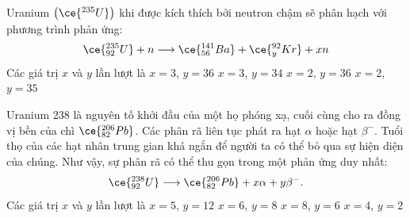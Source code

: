 \begin{ex}
	Uranium $\left(\ce{^{235}U}\right)$ khi được kích thích bởi neutron chậm	sẽ phân hạch với phương trình phản ứng:
	$$\ce{^{235}_{92}U}+n\longrightarrow \ce{^{141}_{56}Ba}+\ce{^{92}_{y}Kr}+xn$$
	Các giá trị $x$ và $y$ lần lượt là
	\choice
	{\True $x=3$, $y=36$}
	{$x=3$, $y=34$}
	{$x=2$, $y=36$}
	{$x=2$, $y=35$}
\end{ex}
\begin{ex}
	Uranium 238 là nguyên tố khởi đầu của một họ phóng xạ, cuối cùng cho ra đồng vị bền của chì $\ce{^{206}_{82}Pb}$. Các phân rã liên tục phát ra hạt $\alpha$ hoặc hạt $\beta^{-}$. Tuổi thọ của các hạt nhân trung gian khá ngắn để người ta có thể bỏ qua sự hiện diện của chúng. Như vậy, sự phân rã có thể thu gọn trong một phản ứng duy nhất:
	$$\ce{^{238}_{92}U}\longrightarrow \ce{^{206}_{82}Pb}+x\alpha+y\beta^-.$$ 
	Các giá trị $x$ và $y$ lần lượt là
	\choice
	{$x=5$, $y=12$}
	{$x=6$, $y=8$}
	{\True $x=8$, $y=6$}
	{$x=4$, $y=2$}
\end{ex}

